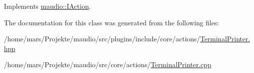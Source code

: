 Implements \hyperlink{classmaudio_1_1IAction_a610804d37c46509f3eaa1aebceab7e35}{maudio\-::\-I\-Action}.



The documentation for this class was generated from the following files\-:\begin{DoxyCompactItemize}
\item 
/home/mars/\-Projekte/maudio/src/plugins/include/core/actions/\hyperlink{TerminalPrinter_8hpp}{Terminal\-Printer.\-hpp}\item 
/home/mars/\-Projekte/maudio/src/core/actions/\hyperlink{core_2actions_2TerminalPrinter_8cpp}{Terminal\-Printer.\-cpp}\end{DoxyCompactItemize}
